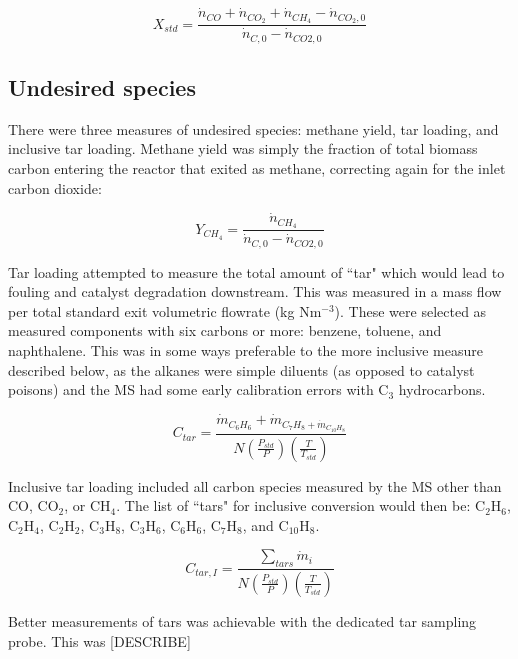 \documentclass[11pt,twocolumn]{article}
\begin{document}
\begin{equation}
	X_{std} =  \frac{\dot{n}_{CO}+\dot{n}_{CO_{2}}+\dot{n}_{CH_{4}}-\dot{n}_{CO_{2},0}}{\dot{n}_{C,0}-\dot{n}_{CO{2},0}}
\end{equation}

\subsection*{Undesired species}

There were three measures of undesired species: methane yield, tar loading, and inclusive tar loading.  Methane yield was simply the fraction of total biomass carbon entering the reactor that exited as methane, correcting again for the inlet carbon dioxide:

\begin{equation}
	Y_{CH_{4}} = \frac{\dot{n}_{CH_{4}}}{\dot{n}_{C,0}-\dot{n}_{CO{2},0}}
\end{equation}

Tar loading attempted to measure the total amount of ``tar" which would lead to fouling and catalyst degradation downstream.  This was measured in a mass flow per total standard exit volumetric flowrate (kg Nm$^{-3}$).  These were selected as measured components with six carbons or more: benzene, toluene, and naphthalene.  This was in some ways preferable to the more inclusive measure described below, as the alkanes were simple diluents (as opposed to catalyst poisons) and the MS had some early calibration errors with C$_3$ hydrocarbons.

\begin{equation}
	C_{tar} = \frac{\dot{m}_{C_{6}H_{6}}+\dot{m}_{C_{7}H_{8}+\dot{m}_{C_{10}H_{8}}}}{N\left(\frac{P_{std}}{P}\right)\left(\frac{T}{T_{std}}\right)}
\end{equation}

Inclusive tar loading included all carbon species measured by the MS other than CO, CO$_2$, or CH$_4$.  The list of ``tars" for inclusive conversion would then be: C$_2$H$_6$, C$_2$H$_4$, C$_2$H$_2$, C$_3$H$_8$, C$_3$H$_6$, C$_6$H$_6$, C$_7$H$_8$, and C$_{10}$H$_8$.

\begin{equation}
	C_{tar,I} = \frac{\sum_{tars}\dot{m}_{i}}{N\left(\frac{P_{std}}{P}\right)\left(\frac{T}{T_{std}}\right)}
\end{equation}

Better measurements of tars was achievable with the dedicated tar sampling probe.  This was [DESCRIBE]
\end{document}
